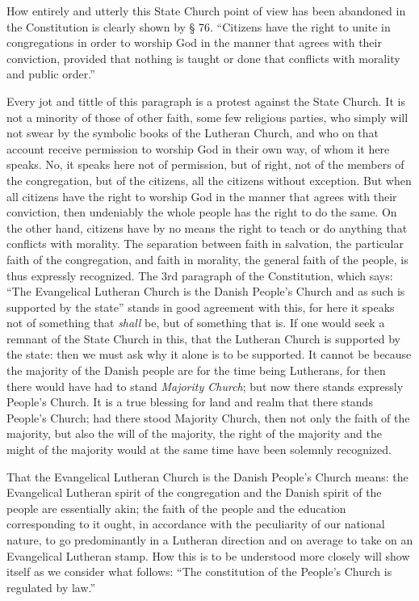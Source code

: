 \documentclass[12pt,a4paper,openany]{book}
\newcommand{\opage}[1]{\marginnote{\footnotesize\textit{[#1]}}}
\begin{document}
How entirely and utterly this State Church point of view
has been abandoned in the Constitution is clearly shown by
§ 76. ``Citizens have the right to unite in congregations
in order to worship God in the manner that agrees with
their conviction, provided that nothing is taught or done
that conflicts with morality and public order.''

Every jot and tittle of this paragraph is a
protest against the State Church. It is not a minority
of those of other faith, some few religious parties,
who simply will not swear by the symbolic books
of the Lutheran Church, and who on that account receive
permission to worship God in their own way, of whom
it here speaks. No, it speaks here not of permission, but
of right, not of the members of the congregation, but of
the citizens, all the citizens without exception. But when
all citizens have the right to worship God in the manner
that agrees with their conviction, then undeniably the
whole people has the right to do the same.
On the other hand, citizens have by no means the right to teach or
\setcounter{footnote}{0}%
\opage{107}do anything that conflicts with morality. The separation
between faith in salvation, the particular faith of the congregation,
and faith in morality, the general faith of the people,
is thus expressly recognized. The 3rd paragraph
of the Constitution, which says: ``The Evangelical Lutheran
Church is the Danish People's Church and as
such is supported by the state'' stands in good agreement with this,
for here it speaks not of something that \emph{shall}
be, but of something that is. If one would seek a remnant
of the State Church in this, that the Lutheran Church is supported
by the state: then we must ask why it
alone is to be supported. It cannot be because
the majority of the Danish people are for the time being Lutherans,
for then there would have had to stand \emph{Majority Church};
but now there stands expressly People's Church. It is a
true blessing for land and realm that there stands People's Church;
had there stood Majority Church, then not only the faith of the majority, but also
the will of the majority, the right of the majority and the might of the majority
would at the same time have been solemnly
recognized.

That the Evangelical Lutheran Church is the Danish
People's Church means: the Evangelical Lutheran spirit of the congregation
and the Danish spirit of the people are essentially akin;
the faith of the people and the education corresponding to it
ought, in accordance with the peculiarity of our national nature,
to go predominantly in a Lutheran direction and on average
to take on an Evangelical Lutheran stamp. How this
is to be understood more closely will show itself as we consider
what follows: ``The constitution of the People's Church is regulated
by law.''
\end{document}

